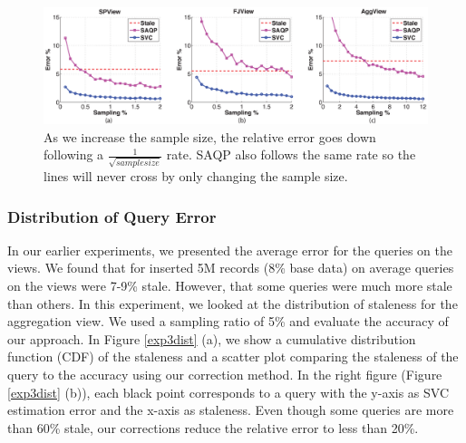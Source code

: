 \begin{figure}[ht!]
 \includegraphics[trim = 45mm 0mm 45mm 0mm, clip,width=\columnwidth]{exp/exp1-samplesize-accuracy.eps}\vspace{-1em}
 \caption{As we increase the sample size, the relative error goes down following a $\frac{1}{\sqrt{samplesize}}$ rate. SAQP also follows the same rate so the lines will never cross by only changing the sample size. \label{exp1sample} }\vspace{-1em}
\end{figure}

\subsubsection{Distribution of Query Error} In our earlier experiments, we presented the average error for the queries on the views.
We found that for inserted 5M records (8\% base data) on average queries on the views were 7-9\% stale. 
However, that some queries were much more stale than others.
In this experiment, we looked at the distribution of staleness for the aggregation view.
We used a sampling ratio of 5\% and evaluate the accuracy of our approach. 
In Figure \ref{exp3dist} (a), we show a cumulative distribution function (CDF) of the staleness and a scatter plot comparing the staleness of the query to the accuracy using our correction method.
In the right figure (Figure \ref{exp3dist} (b)), each black point corresponds to a query with the y-axis as SVC estimation error and the x-axis as staleness. 
Even though some queries are more than 60\% stale, our corrections reduce the relative error to less than 20\%.

